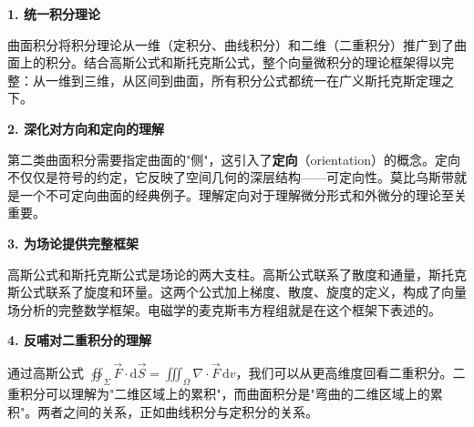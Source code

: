 \begin{connectionbox}
\textbf{1. 统一积分理论}

曲面积分将积分理论从一维（定积分、曲线积分）和二维（二重积分）推广到了曲面上的积分。结合高斯公式和斯托克斯公式，整个向量微积分的理论框架得以完整：从一维到三维，从区间到曲面，所有积分公式都统一在广义斯托克斯定理之下。

\textbf{2. 深化对方向和定向的理解}

第二类曲面积分需要指定曲面的"侧"，这引入了\textbf{定向}（orientation）的概念。定向不仅仅是符号的约定，它反映了空间几何的深层结构——可定向性。莫比乌斯带就是一个不可定向曲面的经典例子。理解定向对于理解微分形式和外微分的理论至关重要。

\textbf{3. 为场论提供完整框架}

高斯公式和斯托克斯公式是场论的两大支柱。高斯公式联系了散度和通量，斯托克斯公式联系了旋度和环量。这两个公式加上梯度、散度、旋度的定义，构成了向量场分析的完整数学框架。电磁学的麦克斯韦方程组就是在这个框架下表述的。

\textbf{4. 反哺对二重积分的理解}

通过高斯公式 $\oiint_\Sigma \vec{F}\cdot\mathrm{d}\vec{S} = \iiint_\Omega \nabla\cdot\vec{F}\,\mathrm{d}v$，我们可以从更高维度回看二重积分。二重积分可以理解为"二维区域上的累积"，而曲面积分是"弯曲的二维区域上的累积"。两者之间的关系，正如曲线积分与定积分的关系。
\end{connectionbox}
